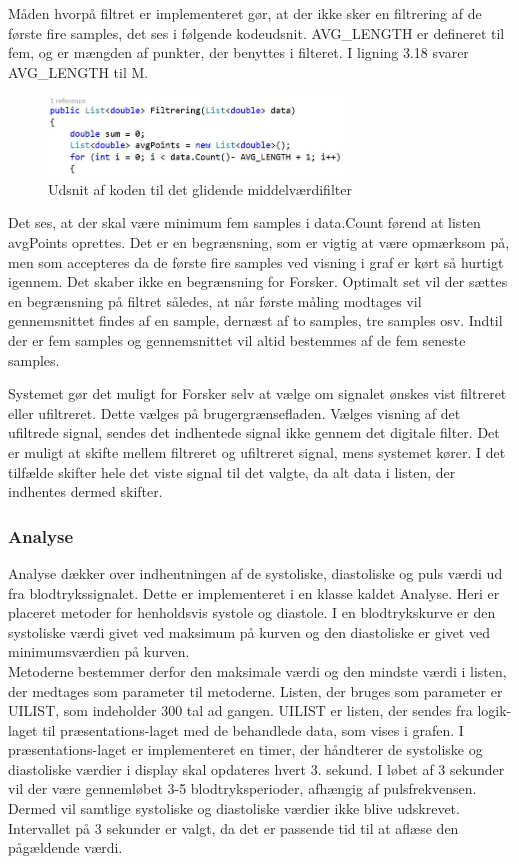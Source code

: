 Måden hvorpå filtret er implementeret gør, at der ikke sker en filtrering af de første fire samples, det ses i følgende kodeudsnit. AVG\_LENGTH er defineret til fem, og er mængden af punkter, der benyttes i filteret. I ligning 3.18 svarer AVG\_LENGTH til M.

\begin{figure}[H]
	\centering
	\includegraphics[width=0.7\textwidth]{Figurer/UdsnitFilter}
	\caption{Udsnit af koden til det glidende middelværdifilter}
	\label{fig:Glidende_middelfilter}
\end{figure}

Det ses, at der skal være minimum fem samples i data.Count førend at listen avgPoints oprettes. Det er en begrænsning, som er vigtig at være opmærksom på, men som accepteres da de første fire samples ved visning i graf er kørt så hurtigt igennem. Det skaber ikke en begrænsning for Forsker. Optimalt set vil der sættes en begrænsning på filtret således, at når første måling modtages vil gennemsnittet findes af en sample, dernæst af to samples, tre samples osv. Indtil der er fem samples og gennemsnittet vil altid bestemmes af de fem seneste samples. 

Systemet gør det muligt for Forsker selv at vælge om signalet ønskes vist filtreret eller ufiltreret. Dette vælges på brugergrænsefladen. Vælges visning af det ufiltrede signal, sendes det indhentede signal ikke gennem det digitale filter. Det er muligt at skifte mellem filtreret og ufiltreret signal, mens systemet kører. I det tilfælde skifter hele det viste signal til det valgte, da alt data i listen, der indhentes dermed skifter. 

\subsubsection{Analyse}
Analyse dækker over indhentningen af de systoliske, diastoliske og puls værdi ud fra blodtrykssignalet. Dette er implementeret i en klasse kaldet Analyse. Heri er placeret metoder for henholdsvis systole og diastole. I en blodtrykskurve er den systoliske værdi givet ved maksimum på kurven og den diastoliske er givet ved minimumsværdien på kurven. \\
Metoderne bestemmer derfor den maksimale værdi og den mindste værdi i listen, der medtages som parameter til metoderne. Listen, der bruges som parameter er UILIST, som indeholder 300 tal ad gangen. UILIST er listen, der sendes fra logik-laget til præsentations-laget med de behandlede data, som vises i grafen. I præsentations-laget er implementeret en timer, der håndterer de systoliske og diastoliske værdier i display skal opdateres hvert 3. sekund. I løbet af 3 sekunder vil der være gennemløbet 3-5 blodtryksperioder, afhængig af pulsfrekvensen. Dermed vil samtlige systoliske og diastoliske værdier ikke blive udskrevet. Intervallet på 3 sekunder er valgt, da det er passende tid til at aflæse den pågældende værdi.

